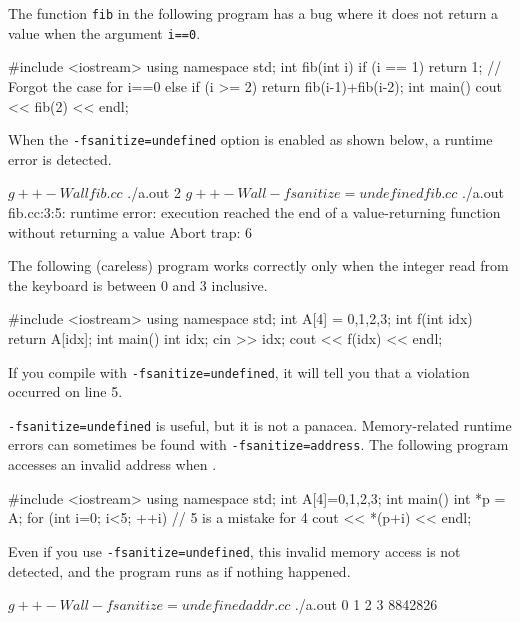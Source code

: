 The function \texttt{fib} in the following program has a bug where it does not return a value when the argument \texttt{i==0}.
\begin{cbox}
#include <iostream>
using namespace std;
int fib(int i) {
  if (i == 1) return 1; // Forgot the case for i==0
  else if (i >= 2) return fib(i-1)+fib(i-2);
}
int main() {
  cout << fib(2) << endl;
}  
\end{cbox}

When the \texttt{-fsanitize=undefined} option is enabled as shown below, a runtime error is detected.
\begin{terminal}[emph={fsanitize,undefined}]
$ g++ -Wall fib.cc
$ ./a.out
2  
$ g++ -Wall -fsanitize=undefined fib.cc
$ ./a.out 
fib.cc:3:5: runtime error: execution reached the end of a value-returning function without returning a value
Abort trap: 6
\end{terminal}

The following (careless) program works correctly only when the integer read from the keyboard is between 0 and 3 inclusive.
\begin{cbox}
#include <iostream>
using namespace std;
int A[4] = {0,1,2,3};
int f(int idx) {
  return A[idx];
}
int main() {
  int idx;
  cin >> idx;
  cout << f(idx) << endl;
}
\end{cbox}

If you compile with \texttt{-fsanitize=undefined}, it will tell you that a violation occurred on line 5.


\texttt{-fsanitize=undefined} is useful, but it is not a panacea.
Memory-related runtime errors can sometimes be found with \texttt{-fsanitize=address}.
The following program accesses an invalid address when .
\begin{cbox}
#include <iostream>
using namespace std;
int A[4]={0,1,2,3};
int main() {
  int *p = A;
  for (int i=0; i<5; ++i) // 5 is a mistake for 4
    cout << *(p+i) << endl;
}  
\end{cbox}
Even if you use \texttt{-fsanitize=undefined}, this invalid memory access is not detected, and the program runs as if nothing happened.
\begin{terminal}[emph={fsanitize,undefined}]
$ g++ -Wall -fsanitize=undefined addr.cc 
$ ./a.out 
0
1
2
3
8842826
\end{terminal}

